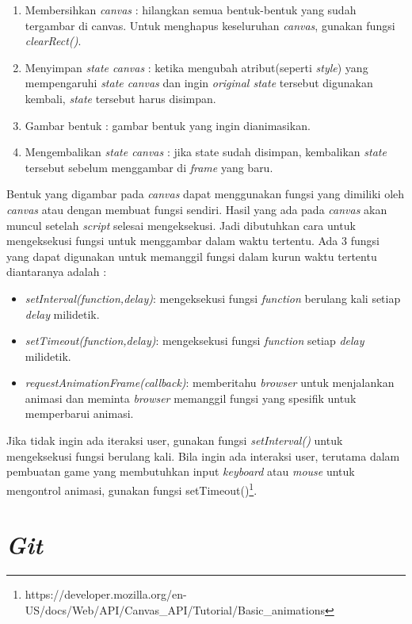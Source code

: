 \begin{enumerate}
	\item Membersihkan \textit{canvas} : hilangkan semua bentuk-bentuk yang sudah tergambar di canvas. Untuk menghapus keseluruhan \textit{canvas}, gunakan fungsi \textit{clearRect()}.
	\item Menyimpan \textit{state canvas} : ketika mengubah atribut(seperti \textit{style}) yang mempengaruhi \textit{state canvas} dan ingin \textit{original state} tersebut digunakan kembali, \textit{state} tersebut harus disimpan. 
	\item Gambar bentuk : gambar bentuk yang ingin dianimasikan.
	\item Mengembalikan \textit{state canvas} : jika state sudah disimpan, kembalikan \textit{state} tersebut sebelum menggambar di \textit{frame} yang baru.
\end{enumerate}

Bentuk yang digambar pada \textit{canvas} dapat menggunakan fungsi yang dimiliki oleh \textit{canvas} atau dengan membuat fungsi sendiri. Hasil yang ada pada \textit{canvas} akan muncul setelah \textit{script} selesai mengeksekusi. Jadi dibutuhkan cara untuk mengeksekusi fungsi untuk menggambar dalam waktu tertentu. Ada 3 fungsi yang dapat digunakan untuk memanggil fungsi dalam kurun waktu tertentu diantaranya adalah :

\begin{itemize}
	\item \textit{setInterval(function,delay)}: mengeksekusi fungsi \textit{function} berulang kali setiap \textit{delay} milidetik.
	\item \textit{setTimeout(function,delay)}: mengeksekusi fungsi \textit{function} setiap \textit{delay} milidetik.
	\item \textit{requestAnimationFrame(callback)}: memberitahu \textit{browser} untuk menjalankan animasi dan meminta \textit{browser} memanggil fungsi yang spesifik untuk memperbarui animasi.
\end{itemize}

Jika tidak ingin ada iteraksi user, gunakan fungsi \textit{setInterval()} untuk mengeksekusi fungsi berulang kali. Bila ingin ada interaksi user, terutama dalam pembuatan game yang membutuhkan input \textit{keyboard} atau \textit{mouse} untuk mengontrol animasi, gunakan fungsi setTimeout()\footnote{https://developer.mozilla.org/en-US/docs/Web/API/Canvas\_API/Tutorial/Basic\_animations}.


\section{\textit{Git}}
\label{sec:Git}

